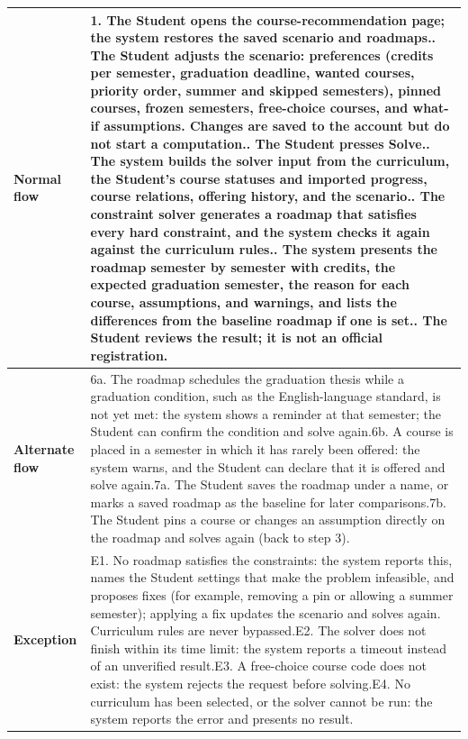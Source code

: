 \begin{longtable}{|p{}|p{}|}
\textbf{Normal flow} & 1. The Student opens the course-recommendation page; the system restores the saved scenario and roadmaps.\newline 2. The Student adjusts the scenario: preferences (credits per semester, graduation deadline, wanted courses, priority order, summer and skipped semesters), pinned courses, frozen semesters, free-choice courses, and what-if assumptions. Changes are saved to the account but do not start a computation.\newline 3. The Student presses Solve.\newline 4. The system builds the solver input from the curriculum, the Student's course statuses and imported progress, course relations, offering history, and the scenario.\newline 5. The constraint solver generates a roadmap that satisfies every hard constraint, and the system checks it again against the curriculum rules.\newline 6. The system presents the roadmap semester by semester with credits, the expected graduation semester, the reason for each course, assumptions, and warnings, and lists the differences from the baseline roadmap if one is set.\newline 7. The Student reviews the result; it is not an official registration. \\
\hline
\textbf{Alternate flow} & 6a. The roadmap schedules the graduation thesis while a graduation condition, such as the English-language standard, is not yet met: the system shows a reminder at that semester; the Student can confirm the condition and solve again.\newline 6b. A course is placed in a semester in which it has rarely been offered: the system warns, and the Student can declare that it is offered and solve again.\newline 7a. The Student saves the roadmap under a name, or marks a saved roadmap as the baseline for later comparisons.\newline 7b. The Student pins a course or changes an assumption directly on the roadmap and solves again (back to step 3). \\
\hline
\textbf{Exception} & E1. No roadmap satisfies the constraints: the system reports this, names the Student settings that make the problem infeasible, and proposes fixes (for example, removing a pin or allowing a summer semester); applying a fix updates the scenario and solves again. Curriculum rules are never bypassed.\newline E2. The solver does not finish within its time limit: the system reports a timeout instead of an unverified result.\newline E3. A free-choice course code does not exist: the system rejects the request before solving.\newline E4. No curriculum has been selected, or the solver cannot be run: the system reports the error and presents no result. \\
\hline
\end{longtable}

